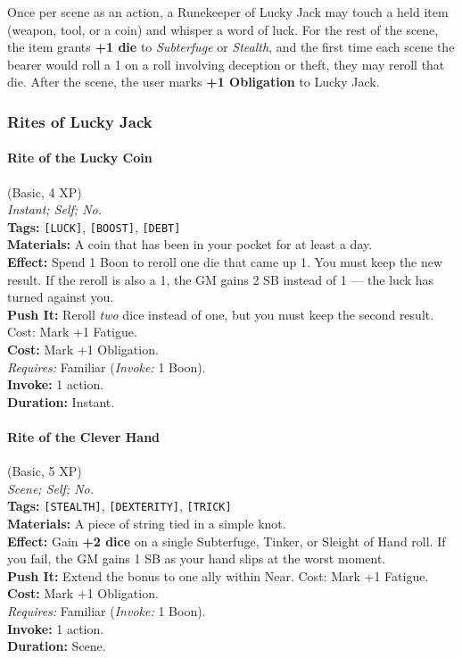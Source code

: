 Once per scene as an action, a Runekeeper of Lucky Jack may touch a held item (weapon, tool, or a coin) and whisper a word of luck. For the rest of the scene, the item grants \textbf{+1 die} to \textit{Subterfuge} or \textit{Stealth}, and the first time each scene the bearer would roll a 1 on a roll involving deception or theft, they may reroll that die. After the scene, the user marks \textbf{+1 Obligation} to Lucky Jack.

\subsubsection*{Rites of Lucky Jack}

\paragraph{Rite of the Lucky Coin} (Basic, 4 XP) \hfill \\
\emph{Instant; Self; No.} \\
\textbf{Tags:} \texttt{[LUCK]}, \texttt{[BOOST]}, \texttt{[DEBT]} \\
\textbf{Materials:} A coin that has been in your pocket for at least a day. \\
\textbf{Effect:} Spend 1 Boon to reroll one die that came up 1. You must keep the new result. If the reroll is also a 1, the GM gains 2 SB instead of 1 --- the luck has turned against you. \\
\textbf{Push It:} Reroll \textit{two} dice instead of one, but you must keep the second result. Cost: Mark +1 Fatigue. \\
\textbf{Cost:} Mark +1 Obligation. \\
\textit{Requires:} Familiar (\textit{Invoke:} 1 Boon). \\
\textbf{Invoke:} 1 action. \\
\textbf{Duration:} Instant.

\paragraph{Rite of the Clever Hand} (Basic, 5 XP) \hfill \\
\emph{Scene; Self; No.} \\
\textbf{Tags:} \texttt{[STEALTH]}, \texttt{[DEXTERITY]}, \texttt{[TRICK]} \\
\textbf{Materials:} A piece of string tied in a simple knot. \\
\textbf{Effect:} Gain \textbf{+2 dice} on a single Subterfuge, Tinker, or Sleight of Hand roll. If you fail, the GM gains 1 SB as your hand slips at the worst moment. \\
\textbf{Push It:} Extend the bonus to one ally within Near. Cost: Mark +1 Fatigue. \\
\textbf{Cost:} Mark +1 Obligation. \\
\textit{Requires:} Familiar (\textit{Invoke:} 1 Boon). \\
\textbf{Invoke:} 1 action. \\
\textbf{Duration:} Scene.

